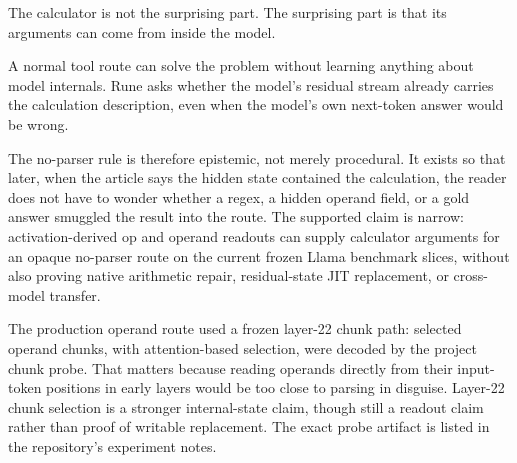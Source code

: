 \documentclass[acmsmall,screen,nonacm]{acmart}
\begin{document}
The calculator is not the surprising part. The surprising part is that its
arguments can come from inside the model.

A normal tool route can solve the problem without learning anything about model
internals. Rune asks whether the model's residual stream already carries the
calculation description, even when the model's own next-token answer would be
wrong.

The no-parser rule is therefore epistemic, not merely procedural. It exists so
that later, when the article says the hidden state contained the calculation,
the reader does not have to wonder whether a regex, a hidden operand field, or a
gold answer smuggled the result into the route. The supported claim is narrow:
activation-derived op and operand readouts can supply calculator arguments for
an opaque no-parser route on the current frozen Llama benchmark slices, without
also proving native arithmetic repair, residual-state JIT replacement, or
cross-model transfer.

The production operand route used a frozen layer-22 chunk path: selected
operand chunks, with attention-based selection, were decoded by the project
chunk probe. That matters because reading operands directly from their
input-token positions in early layers would be too close to parsing in
disguise. Layer-22 chunk selection is a stronger internal-state claim, though
still a readout claim rather than proof of writable replacement. The exact
probe artifact is listed in the repository's experiment notes.
\end{document}
